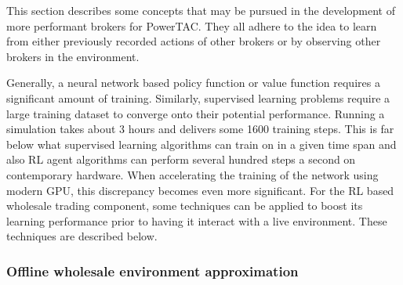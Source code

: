 This section describes some concepts that may be pursued in the development of more performant brokers for
\ac{PowerTAC}. They all adhere to the idea to learn from either previously recorded actions of other brokers or by
observing other brokers in the environment.

Generally, a neural network based policy function or value function requires a significant amount of training.
Similarly, supervised learning problems require a large training dataset to converge onto their potential performance.
Running a simulation takes about 3 hours and delivers some 1600 training steps. This is far below what supervised
learning algorithms can train on in a given time span and also \ac{RL} agent algorithms can perform several hundred
steps a second on contemporary hardware. When accelerating the training of the network using modern \ac{GPU}, this
discrepancy becomes even more significant. For the \ac{RL} based wholesale trading component, some techniques can be
applied to boost its learning performance prior to having it interact with a live environment.  These techniques are
described below.

\subsubsection{Offline wholesale environment approximation}%
\label{ssub:offline_record_based_wholesale_environment_approximation}

